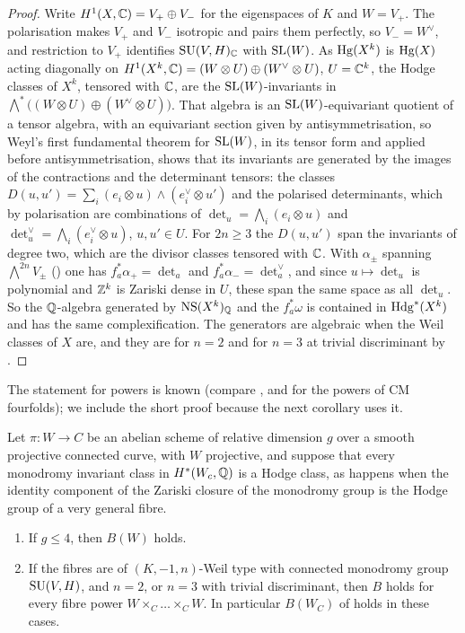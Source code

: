 \begin{proof}
Write $H^{1}(X,\mathbb{C})=V_{+}\oplus V_{-}$ for the eigenspaces of $K$ and
$W=V_{+}$. The polarisation makes $V_{+}$ and $V_{-}$ isotropic and pairs them
perfectly, so $V_{-}=W^{\vee}$, and restriction to $V_{+}$ identifies
$\operatorname{SU}(V,H)_{\mathbb{C}}$ with $\operatorname{SL}(W)$. As $\operatorname{Hg}(X^{k})$ is $\operatorname{Hg}(X)$ acting diagonally
on $H^{1}(X^{k},\mathbb{C})=(W\otimes U)\oplus(W^{\vee}\otimes U)$, $U=\mathbb{C}^{k}$, the
Hodge classes of $X^{k}$, tensored with $\mathbb{C}$, are the $\operatorname{SL}(W)$-invariants in
$\bigwedge^{*}\bigl((W\otimes U)\oplus(W^{\vee}\otimes U)\bigr)$. That algebra
is an $\operatorname{SL}(W)$-equivariant quotient of a tensor algebra, with an equivariant
section given by antisymmetrisation, so Weyl's first fundamental theorem for
$\operatorname{SL}(W)$, in its tensor form and applied before antisymmetrisation, shows
that its invariants are generated by the images of the contractions and the
determinant tensors: the classes
$D(u,u')=\sum_{i}(e_{i}\otimes u)\wedge(e_{i}^{\vee}\otimes u')$ and the
polarised determinants, which by polarisation are combinations of
$\det_{u}=\bigwedge_{i}(e_{i}\otimes u)$ and
$\det^{\vee}_{u}=\bigwedge_{i}(e_{i}^{\vee}\otimes u)$, $u,u'\in U$. For
$2n\ge3$ the $D(u,u')$ span the invariants of degree two, which are the
divisor classes tensored with $\mathbb{C}$. With $\alpha_{\pm}$ spanning
$\bigwedge^{2n}V_{\pm}$ () one has
$f_{a}^{*}\alpha_{+}=\det_{a}$ and $f_{a}^{*}\alpha_{-}=\det^{\vee}_{a}$, and
since $u\mapsto\det_{u}$ is polynomial and $\mathbb{Z}^{k}$ is Zariski dense in
$U$, these span the same space as all $\det_{u}$. So the $\mathbb{Q}$-algebra
generated by $\mathrm{NS}(X^{k})_{\mathbb{Q}}$ and the $f_{a}^{*}\omega$ is contained in
$\mathrm{Hdg}^{*}(X^{k})$ and has the same complexification. The generators are
algebraic when the Weil classes of $X$ are, and they are for $n=2$ and for
$n=3$ at trivial discriminant by \cite{Mar25a}.
\end{proof}

The statement for powers is known (compare \cite{Mil22}, and \cite{Li26}
for the powers of CM fourfolds); we include the short proof because the next
corollary uses it.

\begin{corollary}
\label{cor:lefschetzsmall}
Let $\pi\colon W\to C$ be an abelian scheme of relative dimension $g$ over a
smooth projective connected curve, with $W$ projective, and suppose that
every monodromy invariant class in $H^{*}(W_{c},\mathbb{Q})$ is a Hodge class, as
happens when the identity component of the Zariski closure of the monodromy
group is the Hodge group of a very general fibre.
\begin{enumerate}[label=\textup{(\roman*)},leftmargin=2.6em,itemsep=2pt]
\item If $g\le4$, then $B(W)$ holds.
\item If the fibres are of $(K,-1,n)$-Weil type with connected monodromy
  group $\operatorname{SU}(V,H)$, and $n=2$, or $n=3$ with trivial discriminant, then
  $B$ holds for every fibre power $W\times_{C}\dots\times_{C}W$. In
  particular $B(W_{C})$ of  holds in these cases.
\end{enumerate}
\end{corollary}

